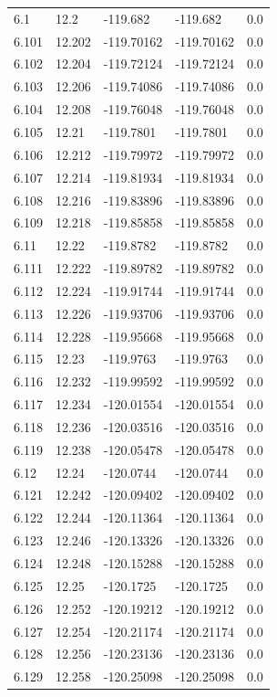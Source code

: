 \begin{tabular}{lllll}
6.1 & 12.2 & -119.682 & -119.682 & 0.0 \\
6.101 & 12.202 & -119.70162 & -119.70162 & 0.0 \\
6.102 & 12.204 & -119.72124 & -119.72124 & 0.0 \\
6.103 & 12.206 & -119.74086 & -119.74086 & 0.0 \\
6.104 & 12.208 & -119.76048 & -119.76048 & 0.0 \\
6.105 & 12.21 & -119.7801 & -119.7801 & 0.0 \\
6.106 & 12.212 & -119.79972 & -119.79972 & 0.0 \\
6.107 & 12.214 & -119.81934 & -119.81934 & 0.0 \\
6.108 & 12.216 & -119.83896 & -119.83896 & 0.0 \\
6.109 & 12.218 & -119.85858 & -119.85858 & 0.0 \\
6.11 & 12.22 & -119.8782 & -119.8782 & 0.0 \\
6.111 & 12.222 & -119.89782 & -119.89782 & 0.0 \\
6.112 & 12.224 & -119.91744 & -119.91744 & 0.0 \\
6.113 & 12.226 & -119.93706 & -119.93706 & 0.0 \\
6.114 & 12.228 & -119.95668 & -119.95668 & 0.0 \\
6.115 & 12.23 & -119.9763 & -119.9763 & 0.0 \\
6.116 & 12.232 & -119.99592 & -119.99592 & 0.0 \\
6.117 & 12.234 & -120.01554 & -120.01554 & 0.0 \\
6.118 & 12.236 & -120.03516 & -120.03516 & 0.0 \\
6.119 & 12.238 & -120.05478 & -120.05478 & 0.0 \\
6.12 & 12.24 & -120.0744 & -120.0744 & 0.0 \\
6.121 & 12.242 & -120.09402 & -120.09402 & 0.0 \\
6.122 & 12.244 & -120.11364 & -120.11364 & 0.0 \\
6.123 & 12.246 & -120.13326 & -120.13326 & 0.0 \\
6.124 & 12.248 & -120.15288 & -120.15288 & 0.0 \\
6.125 & 12.25 & -120.1725 & -120.1725 & 0.0 \\
6.126 & 12.252 & -120.19212 & -120.19212 & 0.0 \\
6.127 & 12.254 & -120.21174 & -120.21174 & 0.0 \\
6.128 & 12.256 & -120.23136 & -120.23136 & 0.0 \\
6.129 & 12.258 & -120.25098 & -120.25098 & 0.0 \\

\end{tabular}
